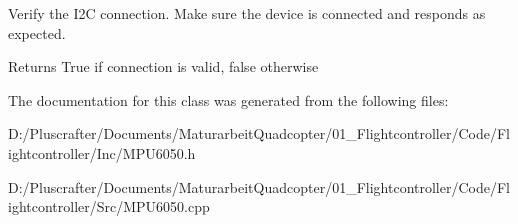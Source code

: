Verify the I2C connection. Make sure the device is connected and responds as expected. \begin{DoxyReturn}{Returns}
True if connection is valid, false otherwise 
\end{DoxyReturn}


The documentation for this class was generated from the following files\+:\begin{DoxyCompactItemize}
\item 
D\+:/\+Pluscrafter/\+Documents/\+Maturarbeit\+Quadcopter/01\+\_\+\+Flightcontroller/\+Code/\+Flightcontroller/\+Inc/M\+P\+U6050.\+h\item 
D\+:/\+Pluscrafter/\+Documents/\+Maturarbeit\+Quadcopter/01\+\_\+\+Flightcontroller/\+Code/\+Flightcontroller/\+Src/M\+P\+U6050.\+cpp\end{DoxyCompactItemize}
